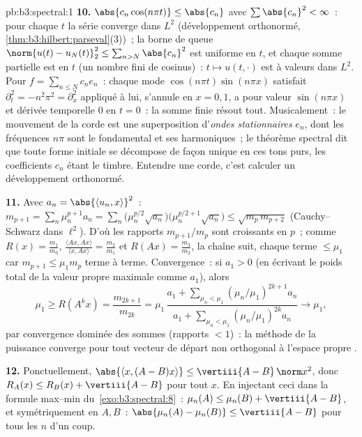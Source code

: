 \begin{solution}{pb:b3:spectral:1}
\textbf{10.} $\abs{c_n\cos(n\pi t)} \leq \abs{c_n}$ avec
$\sum\abs{c_n}^2 < \infty$~: pour chaque $t$ la série
converge dans $L^2$ (développement orthonormé,
\cref{thm:b3:hilbert:parseval}(3))~; la borne de queue
$\norm{u(t) - u_N(t)}_2^2 \leq \sum_{n>N}\abs{c_n}^2$ est
uniforme en $t$, et chaque somme partielle est  en
$t$ (un nombre fini de cosinus)~: $t \mapsto u(t,\cdot)$ est
 à valeurs dans $L^2$. Pour $f = \sum_{n\leq
N}c_ne_n$~: chaque mode $\cos(n\pi t)\sin(n\pi x)$ satisfait
$\partial_t^2 = -n^2\pi^2 = \partial_x^2$ appliqué à lui,
s'annule en $x = 0, 1$, a pour valeur $\sin(n\pi x)$ et
dérivée temporelle $0$ en $t = 0$~: la somme finie résout
tout. Musicalement~: le mouvement de la corde est une
superposition d'\emph{ondes stationnaires} $e_n$, dont les
fréquences $n\pi$ sont le fondamental et ses harmoniques~; le
théorème spectral dit que toute forme initiale se décompose
de façon unique en ces tons purs, les coefficients $c_n$
étant le timbre. Entendre une corde, c'est calculer un
développement orthonormé.

\textbf{11.} Avec $a_n = \abs{\langle u_n, x\rangle}^2$~:
$m_{p+1} = \sum_n\mu_n^{p+1}a_n =
\sum_n\bigl(\mu_n^{p/2}\sqrt{a_n}\bigr)\bigl(\mu_n^{p/2+1}\sqrt{a_n}\bigr)
\leq \sqrt{m_p\,m_{p+2}}$ (Cauchy--Schwarz dans $\ell^2$).
D'où les rapports $m_{p+1}/m_p$ sont croissants en $p$~;
comme $R(x) = \frac{m_1}{m_0}$, $\frac{\langle Ax,
Ax\rangle}{\langle x, Ax\rangle} = \frac{m_2}{m_1}$ et
$R(Ax) = \frac{m_3}{m_2}$, la chaîne suit, chaque terme
$\leq \mu_1$ car $m_{p+1} \leq \mu_1m_p$ terme à terme.
Convergence~: si $a_1 > 0$ (en écrivant le poids total de la
valeur propre maximale comme $a_1$), alors
\[
\mu_1 \geq R(A^kx) = \frac{m_{2k+1}}{m_{2k}} =
\mu_1\,\frac{a_1 + \sum_{\mu_n<\mu_1}(\mu_n/\mu_1)^{2k+1}
a_n}{a_1 + \sum_{\mu_n<\mu_1}(\mu_n/\mu_1)^{2k}a_n}
\longrightarrow \mu_1,
\]
par convergence dominée des sommes (rapports $< 1$)~: la
méthode de la puissance converge pour tout vecteur de départ
non orthogonal à l'espace propre .

\textbf{12.} Ponctuellement, $\abs{\langle x, (A - B)x\rangle}
\leq \vertiii{A - B}\,\norm x^2$, donc $R_A(x) \leq R_B(x) +
\vertiii{A - B}$ pour tout $x$. En injectant ceci dans la
formule max--min du~\cref{exo:b3:spectral:8}~: $\mu_n(A)
\leq \mu_n(B) + \vertiii{A - B}$, et symétriquement en $A,
B$~: $\abs{\mu_n(A) - \mu_n(B)} \leq \vertiii{A - B}$ pour
tous les $n$ d'un coup.


\end{solution}

